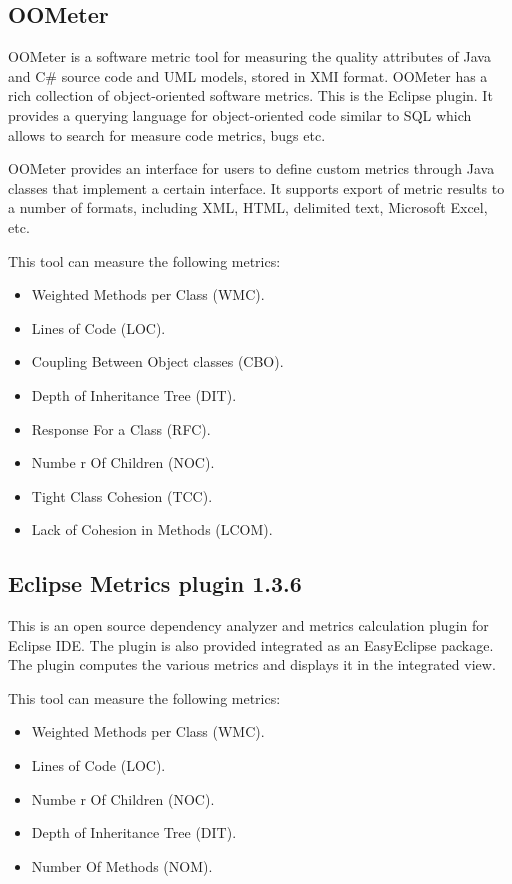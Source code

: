 \subsection{OOMeter}

OOMeter is a software metric tool for measuring the quality attributes of Java and C\# source code and UML models, stored in XMI format. OOMeter has a rich collection of object-oriented software metrics. This is the Eclipse plugin. It provides a querying language for object-oriented code similar to SQL which allows to search for measure code metrics, bugs etc.

OOMeter provides an interface for users to define custom metrics through Java classes that implement a certain interface. It supports export of metric results to a number of formats, including XML, HTML, delimited text, Microsoft Excel, etc.

This tool can measure the following metrics:

\begin{itemize}
	\item Weighted Methods per Class (WMC).
	\item Lines of Code (LOC). 
	\item Coupling Between Object classes (CBO).
	\item Depth of Inheritance Tree (DIT).
	\item Response For a Class (RFC).
	\item Numbe r Of Children (NOC).
	\item Tight Class Cohesion (TCC).
	\item Lack of Cohesion in Methods (LCOM).
\end{itemize}



\subsection{Eclipse Metrics plugin 1.3.6}

This is an open source dependency analyzer and metrics calculation plugin for Eclipse IDE. The plugin is also provided 
integrated as an EasyEclipse package. The plugin computes the various metrics and displays it in the integrated view.


This tool can measure the following metrics:

\begin{itemize}
	\item Weighted Methods per Class (WMC).
	\item Lines of Code (LOC). 
	\item Numbe r Of Children (NOC).
	\item Depth of Inheritance Tree (DIT).
    \item Number Of Methods (NOM).
\end{itemize}

